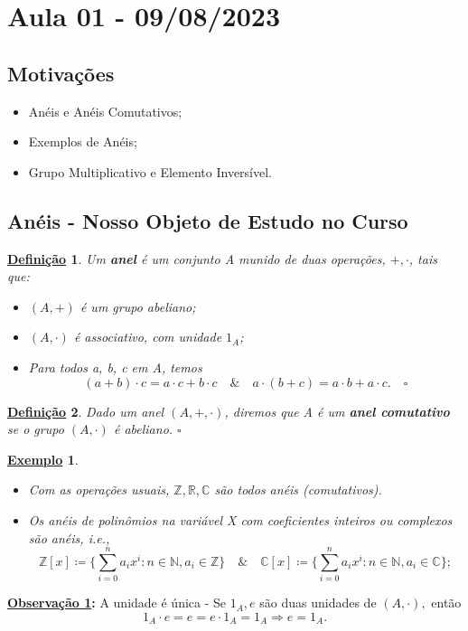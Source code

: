 \documentclass{article}
\newtheorem*{def*}{\underline{Defini\c c\~ao}}
\newtheorem{example}{\underline{Exemplo}}
\begin{document}
\section{Aula 01 - 09/08/2023}
\subsection{Motivações}
\begin{itemize}
  \item Anéis e Anéis Comutativos;
  \item Exemplos de Anéis;
  \item Grupo Multiplicativo e Elemento Inversível.
\end{itemize}
\subsection{Anéis - Nosso Objeto de Estudo no Curso}
\begin{def*}
  Um \textbf{anel} é um conjunto A munido de duas operações, \(+, \cdot \), tais que:
  \begin{itemize}
    \item[1)] \((A, +)\) é um grupo abeliano;
    \item[2)] \((A, \cdot )\) é associativo, com unidade \(1_{A}\);
    \item[3)] Para todos a, b, c em A, temos 
      \[
        (a+b)\cdot c = a \cdot c + b \cdot c \quad\&\quad a \cdot (b+c) = a \cdot b + a \cdot c.\quad\square
      \]
  \end{itemize}
\end{def*}
\begin{def*}
  Dado um anel \((A, +, \cdot )\), diremos que A é um \textbf{anel comutativo} se o grupo \((A, \cdot )\) é abeliano. \(\square\)
\end{def*}
\begin{example}
  \begin{itemize}
    \item[1)] Com as operações usuais, \(\mathbb{Z}, \mathbb{R}, \mathbb{C}\) são todos anéis (comutativos).
    \item[2)] Os anéis de polinômios na variável X com coeficientes inteiros ou complexos são anéis, i.e., 
      \[
        \mathbb{Z}[x]\coloneqq \biggl\{\sum\limits_{i=0}^{n}a_{i}x^{i}: n\in \mathbb{N}, a_{i}\in \mathbb{Z}\biggr\}\quad\&\quad \mathbb{C}[x]\coloneqq \biggl\{\sum\limits_{i=0}^{n}a_{i}x^{i}:n\in \mathbb{N}, a_{i}\in \mathbb{C}\biggr\};
      \]

  \end{itemize}
\end{example}
\textbf{\underline{Observação 1}:} A unidade é única - Se \(1_{A}, e\) são duas unidades de \((A, \cdot ),\) então 
\[
  1_{A}\cdot e = e = e \cdot 1_{A} = 1_{A} \Rightarrow e = 1_{A}.
\]
\end{document}
